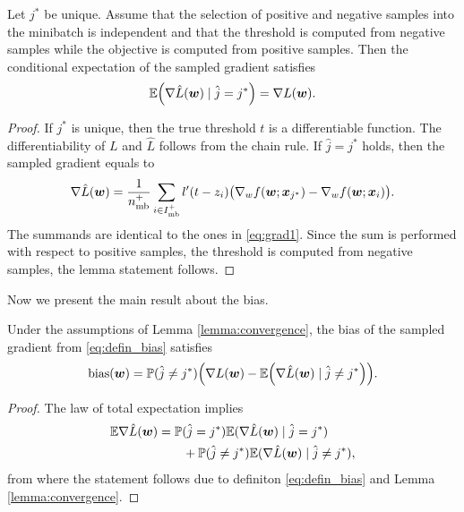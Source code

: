 \begin{lemma}\label{lemma:convergence}
  Let $j^*$ be unique. Assume that the selection of positive and negative samples into the minibatch is independent and that the threshold is computed from negative samples while the objective is computed from positive samples. Then the conditional expectation of the sampled gradient satisfies
  \begin{equation*}
    \EE\Brac{\nabla \hat L(\bm{w}) \mid \hat j=j^*} =  \nabla L(\bm{w}).
  \end{equation*}
\end{lemma}
\begin{proof}
  If $j^*$ is unique, then the true threshold $t$ is a differentiable function. The differentiability of $L$ and $\hat L$ follows from the chain rule. If $\hat j=j^*$ holds, then the sampled gradient equals to
  \begin{equation}\label{eq:grad_min_aux}
    \nabla \hat L(\bm{w})= \frac{1}{n_{\rm mb}^+}\sum_{i\in I_{\rm mb}^+}l'(t-z_i)\big(\nabla_w f(\bm{w};\bm{x}_{j^*}) - \nabla_w f(\bm{w};\bm{x}_i) \big).
  \end{equation}
  The summands are identical to the ones in \eqref{eq:grad1}. Since the sum is performed with respect to positive samples, the threshold is computed from negative samples, the lemma statement follows.
\end{proof}

Now we present the main result about the bias.

\begin{theorem}\label{theorem:convergence}
  Under the assumptions of Lemma \ref{lemma:convergence}, the bias of the sampled gradient from \eqref{eq:defin_bias} satisfies
  \begin{equation}\label{eq:comp_bias}
    \bias(\bm{w}) = \PP(\hat j\neq j^*) \Brac{\nabla L(\bm{w}) - \EE\Brac{\nabla \hat L(\bm{w}) \mid \hat j\neq j^*}}.
  \end{equation}
\end{theorem}
\begin{proof}
  The law of total expectation implies
  \begin{equation*}
    \begin{aligned}
      \mathbb{E} \nabla \hat L(\bm{w})
      & = \mathbb{P}(\hat j=j^*)\mathbb{E}(\nabla \hat L(\bm{w}) \mid \hat j=j^*) \\
      & \qquad + \mathbb{P}(\hat j\neq j^*)\mathbb{E}(\nabla \hat L(\bm{w}) \mid \hat j\neq j^*),
    \end{aligned}
  \end{equation*}
  from where the statement follows due to definiton \eqref{eq:defin_bias} and Lemma \ref{lemma:convergence}.
\end{proof}

